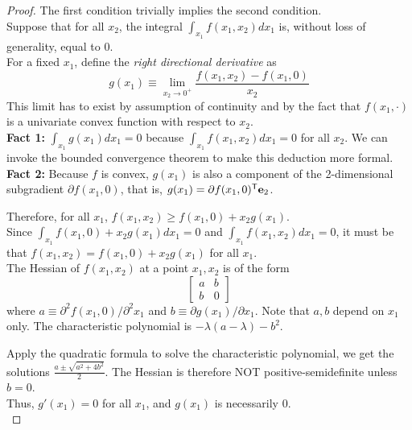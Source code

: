 \documentclass{article}
\begin{document}
\begin{proof}
The first condition trivially implies the second condition.\\

Suppose that for all $x_2$, the integral $\int_{x_1} f(x_1,x_2) dx_1$ is, without loss of generality, equal to $0$. \\

For a fixed $x_1$, define the \emph{right directional derivative} as 
\[
g(x_1) \equiv \lim_{x_2 \rightarrow 0^+} \frac{f(x_1, x_2) - f(x_1, 0)}{x_2}
\]
This limit has to exist by assumption of continuity and by the fact that $f(x_1, \cdot)$ is a univariate convex function with respect to $x_2$.\\

\textbf{Fact 1:} $\int_{x_1} g(x_1) d x_1 = 0$ because $\int_{x_1} f(x_1, x_2) d x_1 = 0$ for all $x_2$. We can invoke the bounded convergence theorem to make this deduction more formal.\\

\textbf{Fact 2:} Because $f$ is convex, $g(x_1)$ is also a component of the 2-dimensional subgradient $\partial f(x_1,0)$, that is, $g(x_1) = \partial f(x_1, 0)^{\mathsf{T}} \mathbf{e}_2$. 

Therefore, for all $x_1$, $f(x_1, x_2) \geq f(x_1, 0) + x_2 g(x_1)$. \\

Since $\int_{x_1} f(x_1, 0) + x_2 g(x_1) dx_1 = 0$ and $\int_{x_1} f(x_1, x_2) dx_1 = 0$, it must be that $f(x_1, x_2) =  f(x_1, 0) + x_2 g(x_1)$ for all $x_1$. \\

The Hessian of $f(x_1, x_2)$ at a point $x_1, x_2$ is of the form
\[
\left[ \begin{array}{cc}
	a & b \\
	b & 0 
	\end{array} \right]
\]
where $a \equiv \partial^2 f(x_1,0)/ \partial^2 x_1$ and $ b \equiv \partial g(x_1) / \partial x_1$.  Note that $a,b$ depend on $x_1$ only. The characteristic polynomial is $-\lambda ( a -\lambda) - b^2$. 

Apply the quadratic formula to solve the characteristic polynomial, we get the solutions $\frac{ a \pm \sqrt{a^2 + 4 b^2}}{2}$. The Hessian is therefore NOT positive-semidefinite unless $b=0$. \\

Thus, $g'(x_1) = 0$ for all $x_1$, and $g(x_1)$ is necessarily $0$.\\
\end{proof}
	
\end{document}
